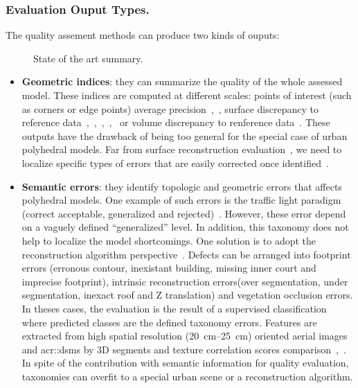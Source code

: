 \documentclass[runningheads]{llncs}
\begin{document}
\subsubsection{Evaluation Ouput Types.}
The quality assement methods can produce two kinds of ouputs:
\begin{figure}[H]
	\begin{center}
		
		\caption{\label{fig::state_of_art} State of the art summary.}
	\end{center}
\end{figure}
\begin{itemize}
	\item \textbf{Geometric indices}: they can summarize the quality of the whole assessed model. These indices are computed at different scales: points of interest (such as corners or edge points) average precision~\cite{Kaartinen2005},~\cite{Voegtle2003}, surface discrepancy to reference data~\cite{Kaartinen2005},~\cite{Henricsson1997},~\cite{Zeng2014},~\cite{Lafarge2012},~\cite{li2016boxfitting} or volume discrepancy to renference data~\cite{Zeng2014}. These outputs have the drawback of being too general for the special case of urban polyhedral models. Far from surface reconstruction evaluation~\cite{berger2013benchmark}, we need to localize specific types of errors that are easily corrected once identified~\cite{OudeElberink2010}.
	\item \textbf{Semantic errors}: they identify topologic and geometric errors that affects polyhedral models. One example of such errors is the traffic light paradigm (correct acceptable, generalized and rejected)~\cite{boudet2006supervised}. However, these error depend on a vaguely defined ``generalized'' level. In addition, this taxonomy does not help to localize the model shortcomings. One solution is to adopt the reconstruction algorithm perspective~\cite{Michelin2013}. Defects can be arranged into footprint errors (erronous contour, inexistant building, missing inner court and imprecise footprint), intrinsic reconstruction errors(over segmentation, under segmentation, inexact roof and Z translation) and vegetation occlusion errors. In theses cases, the evaluation is the result of a supervised classification where predicted classes are the defined taxonomy errors. Features are extracted from high spatial resolution (\SIrange{20}{25}{\cm}) oriented aerial images and \glspl{acr::dsm} by 3D segments and texture correlation scores comparison~\cite{boudet2006supervised},~\cite{Michelin2013}. In spite of the contribution with semantic information for quality evaluation, taxonomies can overfit to a special urban scene or a reconstruction algorithm.
\end{itemize}
\end{document}
